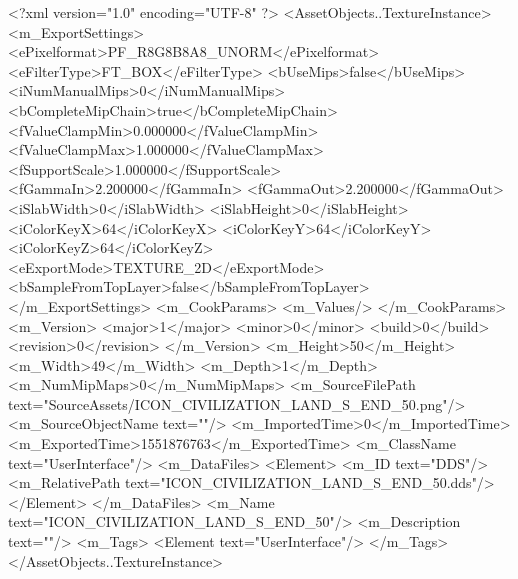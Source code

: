 <?xml version="1.0" encoding="UTF-8" ?>
<AssetObjects..TextureInstance>
	<m_ExportSettings>
		<ePixelformat>PF_R8G8B8A8_UNORM</ePixelformat>
		<eFilterType>FT_BOX</eFilterType>
		<bUseMips>false</bUseMips>
		<iNumManualMips>0</iNumManualMips>
		<bCompleteMipChain>true</bCompleteMipChain>
		<fValueClampMin>0.000000</fValueClampMin>
		<fValueClampMax>1.000000</fValueClampMax>
		<fSupportScale>1.000000</fSupportScale>
		<fGammaIn>2.200000</fGammaIn>
		<fGammaOut>2.200000</fGammaOut>
		<iSlabWidth>0</iSlabWidth>
		<iSlabHeight>0</iSlabHeight>
		<iColorKeyX>64</iColorKeyX>
		<iColorKeyY>64</iColorKeyY>
		<iColorKeyZ>64</iColorKeyZ>
		<eExportMode>TEXTURE_2D</eExportMode>
		<bSampleFromTopLayer>false</bSampleFromTopLayer>
	</m_ExportSettings>
	<m_CookParams>
		<m_Values/>
	</m_CookParams>
	<m_Version>
		<major>1</major>
		<minor>0</minor>
		<build>0</build>
		<revision>0</revision>
	</m_Version>
	<m_Height>50</m_Height>
	<m_Width>49</m_Width>
	<m_Depth>1</m_Depth>
	<m_NumMipMaps>0</m_NumMipMaps>
	<m_SourceFilePath text="SourceAssets/ICON_CIVILIZATION_LAND_S_END_50.png"/>
	<m_SourceObjectName text=""/>
	<m_ImportedTime>0</m_ImportedTime>
	<m_ExportedTime>1551876763</m_ExportedTime>
	<m_ClassName text="UserInterface"/>
	<m_DataFiles>
		<Element>
			<m_ID text="DDS"/>
			<m_RelativePath text="ICON_CIVILIZATION_LAND_S_END_50.dds"/>
		</Element>
	</m_DataFiles>
	<m_Name text="ICON_CIVILIZATION_LAND_S_END_50"/>
	<m_Description text=""/>
	<m_Tags>
		<Element text="UserInterface"/>
	</m_Tags>
</AssetObjects..TextureInstance>

